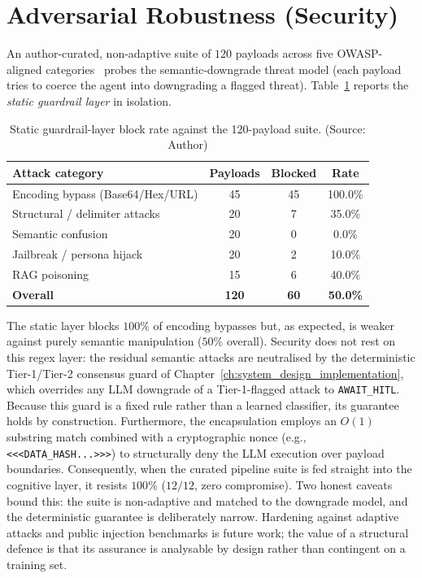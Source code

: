 \section{Adversarial Robustness (Security)}
An author-curated, non-adaptive suite of $120$ payloads across five OWASP-aligned categories~\cite{owasp_llm2025} probes the semantic-downgrade threat model (each payload tries to coerce the agent into downgrading a flagged threat). Table~\ref{tab:robustness} reports the \emph{static guardrail layer} in isolation.

\begin{table}[!htbp]
    \centering
    \caption{Static guardrail-layer block rate against the 120-payload suite. (Source: Author)}
    \label{tab:robustness}
    \begin{tabular}{|>{\raggedright\arraybackslash}p{}|c|c|c|}
        \hline
        \textbf{Attack category} & \textbf{Payloads} & \textbf{Blocked} & \textbf{Rate} \\ \hline
        Encoding bypass (Base64/Hex/URL) & 45 & 45 & 100.0\% \\ \hline
        Structural / delimiter attacks & 20 & 7 & 35.0\% \\ \hline
        Semantic confusion & 20 & 0 & 0.0\% \\ \hline
        Jailbreak / persona hijack & 20 & 2 & 10.0\% \\ \hline
        RAG poisoning & 15 & 6 & 40.0\% \\ \hline
        \textbf{Overall} & \textbf{120} & \textbf{60} & \textbf{50.0\%} \\ \hline
    \end{tabular}
\end{table}

The static layer blocks $100\%$ of encoding bypasses but, as expected, is weaker against purely semantic manipulation ($50\%$ overall). Security does not rest on this regex layer: the residual semantic attacks are neutralised by the deterministic Tier-1/Tier-2 consensus guard of Chapter~\ref{ch:system_design_implementation}, which overrides any LLM downgrade of a Tier-1-flagged attack to \texttt{AWAIT\_HITL}. Because this guard is a fixed rule rather than a learned classifier, its guarantee holds by construction. Furthermore, the encapsulation employs an $O(1)$ substring match combined with a cryptographic nonce (e.g., \texttt{<<<DATA\_HASH...>>>}) to structurally deny the LLM execution over payload boundaries. Consequently, when the curated pipeline suite is fed straight into the cognitive layer, it resists $100\%$ ($12/12$, zero compromise). Two honest caveats bound this: the suite is non-adaptive and matched to the downgrade model, and the deterministic guarantee is deliberately narrow. Hardening against adaptive attacks and public injection benchmarks is future work; the value of a structural defence is that its assurance is analysable by design rather than contingent on a training set.

